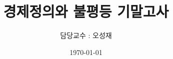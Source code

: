 \documentclass{article}
\begin{document}

\title{경제정의와 불평등 기말고사} %
\author{담당교수 : 오성재} %
\date{\today}

\maketitle

%
\end{document}
